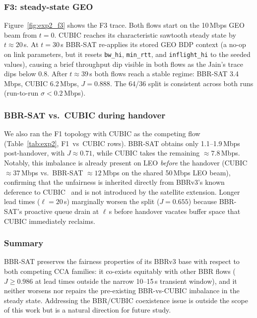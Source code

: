 \subsubsection{F3: steady-state GEO}

Figure~\ref{fig:exp2_f3} shows the F3 trace.
Both flows start on the 10\,Mbps GEO beam from $t = 0$.
CUBIC reaches its characteristic sawtooth steady state by $t \approx 20$\,s.
At $t = 30$\,s BBR-SAT re-applies its stored GEO BDP context
(a no-op on link parameters, but it resets \texttt{bw\_hi},
\texttt{min\_rtt}, and \texttt{inflight\_hi} to the seeded values),
causing a brief throughput dip visible in both flows as the Jain's trace
dips below 0.8.
After $t \approx 39$\,s both flows reach a stable regime:
BBR-SAT 3.4\,Mbps, CUBIC 6.2\,Mbps, $J = 0.888$.
The 64/36 split is consistent across both runs (run-to-run $\sigma < 0.2$\,Mbps).

\subsubsection{BBR-SAT vs.\ CUBIC during handover}

We also ran the F1 topology with CUBIC as the competing flow
(Table~\ref{tab:exp2}, F1~vs~CUBIC rows).
BBR-SAT obtains only 1.1--1.9\,Mbps post-handover, with $J \approx 0.71$,
while CUBIC takes the remaining $\approx7.8$\,Mbps.
Notably, this imbalance is already present on LEO \emph{before} the
handover (CUBIC $\approx 37$\,Mbps vs.\ BBR-SAT $\approx 12$\,Mbps on
the shared 50\,Mbps LEO beam), confirming that the unfairness is
inherited directly from BBRv3's known deference to CUBIC~\cite{cardwell2017}
and is not introduced by the satellite extension.
Longer lead times ($\ell = 20$\,s) marginally worsen the split
($J = 0.655$) because BBR-SAT's proactive queue drain at $\ell$\,s before
handover vacates buffer space that CUBIC immediately reclaims.

\subsubsection{Summary}

BBR-SAT preserves the fairness properties of its BBRv3 base with
respect to both competing CCA families:
it co-exists equitably with other BBR flows ($J \geq 0.986$ at
lead times outside the narrow 10--15\,s transient window), and it
neither worsens nor repairs the pre-existing BBR-vs-CUBIC imbalance
in the steady state.
Addressing the BBR/CUBIC coexistence issue is outside the scope of
this work but is a natural direction for future study.

